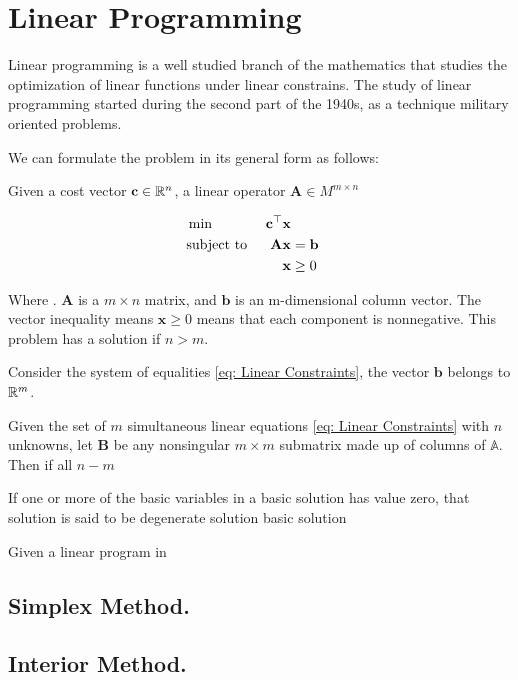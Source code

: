 \chapter{Linear Programming}
Linear programming is a well studied branch of the mathematics that studies the optimization of linear functions under linear constrains. The study of linear programming started during the second part of the 1940s, as a technique military oriented problems.

We can formulate the problem in its general form as follows:

\begin{problem}
	Given a cost vector $\mathbf{c}\in \mathbb{R}^n$, a linear operator $\mathbf{A} \in M^{m\times n}$ 
\end{problem}
\begin{align}
	&\min & \mathbf{c}^\top\mathbf{x} &\\
	&\text{subject to }& \mathbf{A}\mathbf{x}&=\mathbf{b} & \label{eq: Linear Constraints} \\
	& &\mathbf{x}&\geq 0 &
\end{align} 

Where . $\mathbf{A}$ is a $m\times n$ matrix, and $\mathbf{b}$ is an m-dimensional column vector. The vector inequality means $\mathbf{x}\geq 0$ means that each component is nonnegative. This problem has a solution if $n>m$. 

Consider the system of equalities \eqref{eq: Linear Constraints}, the vector $\mathbf{b}$ belongs to $\mathbb{R}^m$.


\begin{definition}
	Given the set of $m$ simultaneous linear equations \eqref{eq: Linear Constraints} with $n$ unknowns, let $\mathbf{B}$ be any nonsingular $m\times m$ submatrix made up of columns of $\mathbb{A}$. Then if all $n-m$ 
\end{definition}

\begin{definition}
	If one or more of the basic variables in a basic solution has value zero, that solution is said to be degenerate solution basic solution
\end{definition}

\begin{theorem} Given a linear program in 
\end{theorem}

\section{Simplex Method.}

\section{Interior Method.}
